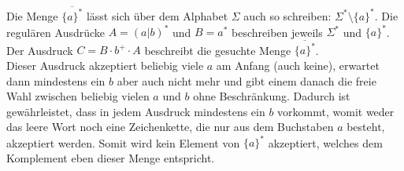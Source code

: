 \documentclass[10pt,a4paper,oneside,ngerman,numbers=noenddot]{scrartcl}
\begin{document}
\section{} %
\subsection{} %
Die Menge $\overline{\{a\}^{*}}$ lässt sich über dem Alphabet $\Sigma$ auch so schreiben: $\Sigma^{*} \setminus \{a\}^{*}$. Die regulären Ausdrücke $A = (a|b)^{*}$ und $B = a^{*}$ beschreiben jeweils $\Sigma^{*}$ und $\{a\}^{*}$.
Der Ausdruck $C = B \cdot b^{+} \cdot A$ beschreibt die gesuchte Menge $\overline{\{a\}^{*}}$.\\
Dieser Ausdruck akzeptiert beliebig viele $a$ am Anfang (auch keine), erwartet dann mindestens ein $b$ aber auch nicht mehr und gibt einem danach die freie Wahl zwischen beliebig vielen $a$ und $b$ ohne Beschränkung. Dadurch ist gewährleistet, dass in jedem Ausdruck mindestens ein $b$ vorkommt, womit weder das leere Wort noch eine Zeichenkette, die nur aus dem Buchstaben $a$ besteht, akzeptiert werden. Somit wird kein Element von $\{a\}^{*}$ akzeptiert, welches dem Komplement eben dieser Menge entspricht.
\end{document}
